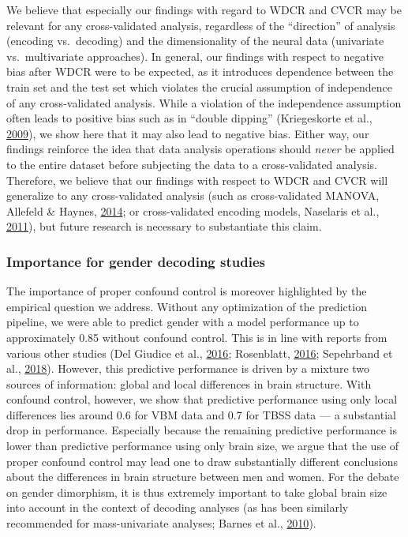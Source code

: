 \documentclass[11pt,american,a4paper,oneside,]{memoir} %
\begin{document}
We believe that especially our findings with regard to WDCR and CVCR may be relevant for any cross-validated analysis, regardless of the ``direction'' of analysis (encoding vs.~decoding) and the dimensionality of the neural data (univariate vs.~multivariate approaches). In general, our findings with respect to negative bias after WDCR were to be expected, as it introduces dependence between the train set and the test set which violates the crucial assumption of independence of any cross-validated analysis. While a violation of the independence assumption often leads to positive bias such as in ``double dipping'' (Kriegeskorte et al., \protect\hyperlink{ref-kriegeskorte2009circular}{2009}), we show here that it may also lead to negative bias. Either way, our findings reinforce the idea that data analysis operations should \emph{never} be applied to the entire dataset before subjecting the data to a cross-validated analysis. Therefore, we believe that our findings with respect to WDCR and CVCR will generalize to any cross-validated analysis (such as cross-validated MANOVA, Allefeld \& Haynes, \protect\hyperlink{ref-allefeld2014searchlight}{2014}; or cross-validated encoding models, Naselaris et al., \protect\hyperlink{ref-Naselaris2011-oh}{2011}), but future research is necessary to substantiate this claim.

\hypertarget{importance-for-gender-decoding-studies}{%
\subsubsection{Importance for gender decoding studies}\label{importance-for-gender-decoding-studies}}

The importance of proper confound control is moreover highlighted by the empirical question we address. Without any optimization of the prediction pipeline, we were able to predict gender with a model performance up to approximately 0.85 without confound control. This is in line with reports from various other studies (Del Giudice et al., \protect\hyperlink{ref-Del_Giudice2016-ns}{2016}; Rosenblatt, \protect\hyperlink{ref-Rosenblatt2016-oy}{2016}; Sepehrband et al., \protect\hyperlink{ref-Sepehrband2018-dy}{2018}). However, this predictive performance is driven by a mixture two sources of information: global and local differences in brain structure. With confound control, however, we show that predictive performance using only local differences lies around 0.6 for VBM data and 0.7 for TBSS data --- a substantial drop in performance. Especially because the remaining predictive performance is lower than predictive performance using only brain size, we argue that the use of proper confound control may lead one to draw substantially different conclusions about the differences in brain structure between men and women. For the debate on gender dimorphism, it is thus extremely important to take global brain size into account in the context of decoding analyses (as has been similarly recommended for mass-univariate analyses; Barnes et al., \protect\hyperlink{ref-Barnes2010-pu}{2010}).
\end{document}
